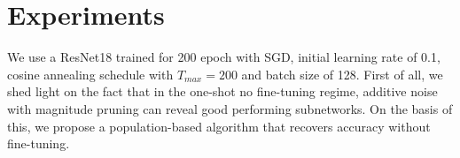 \documentclass[nohyperref]{article}
\theoremstyle{plain}
\theoremstyle{definition}
\theoremstyle{remark}
\begin{document}
\section{Experiments}
We use a ResNet18 \cite{heDeepResidualLearning2015} trained for 200 epoch with
SGD, initial learning rate of 0.1, cosine annealing schedule with $T_{max}=200$ and batch size of 128.
First of all, we shed light on the fact that in the one-shot no fine-tuning regime,
additive noise with magnitude pruning can reveal good performing subnetworks.
On the basis of this, we propose a population-based algorithm that recovers accuracy
without fine-tuning.











\newpage
\appendix
\onecolumn

\end{document}
